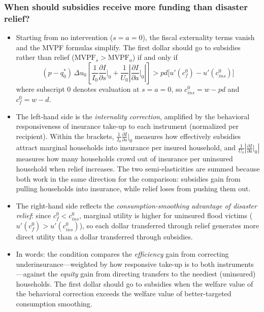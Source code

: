 \documentclass[12pt]{article}
\begin{document}
\subsubsection*{When should subsidies receive more funding than disaster relief?}
\begin{itemize}
    \item Starting from no intervention ($s = a = 0$), the fiscal externality terms vanish and the MVPF formulas simplify. The first dollar should go to subsidies rather than relief ($\text{MVPF}_s > \text{MVPF}_a$) if and only if
    \begin{equation}
    (p - q^*_0)\,\Delta u_0 \left[\frac{1}{I_0}\frac{\partial I}{\partial s}\bigg|_0 + \frac{1}{U_0}\left|\frac{\partial I}{\partial a}\bigg|_0\right|\right] > pd\bigl[u'(c_f^0) - u'(c_{ins}^0)\bigr] \label{eq:subsidy_vs_relief}
    \end{equation}
    where subscript $0$ denotes evaluation at $s=a=0$, so $c_{ins}^0 = w - pd$ and $c_f^0 = w - d$.
    \item The left-hand side is the \emph{internality correction}, amplified by the behavioral responsiveness of insurance take-up to each instrument (normalized per recipient). Within the brackets, $\frac{1}{I_0}\frac{\partial I}{\partial s}\big|_0$ measures how effectively subsidies attract marginal households into insurance per insured household, and $\frac{1}{U_0}|\frac{\partial I}{\partial a}\big|_0|$ measures how many households crowd out of insurance per uninsured household when relief increases. The two semi-elasticities are summed because both work in the same direction for the comparison: subsidies gain from pulling households into insurance, while relief loses from pushing them out.
    \item The right-hand side reflects the \emph{consumption-smoothing advantage of disaster relief}: since $c_f^0 < c_{ins}^0$, marginal utility is higher for uninsured flood victims ($u'(c_f^0) > u'(c_{ins}^0)$), so each dollar transferred through relief generates more direct utility than a dollar transferred through subsidies.
    \item In words: the condition compares the \emph{efficiency} gain from correcting underinsurance---weighted by how responsive take-up is to both instruments---against the \emph{equity} gain from directing transfers to the neediest (uninsured) households. The first dollar should go to subsidies when the welfare value of the behavioral correction exceeds the welfare value of better-targeted consumption smoothing.
\end{itemize}
\end{document}
